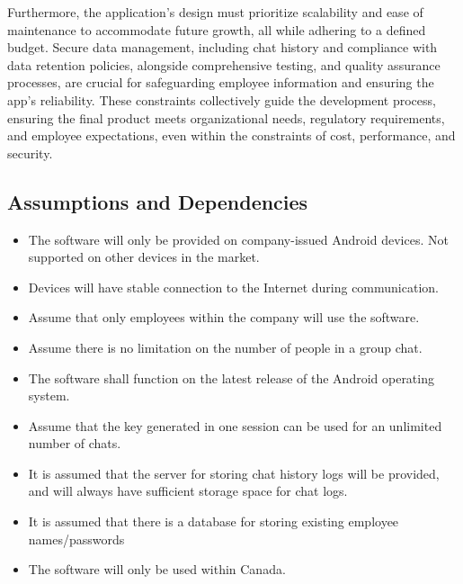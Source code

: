 \documentclass[]{article}
\begin{document}
\hspace{5mm}Furthermore, the application's design must prioritize scalability and ease of maintenance to accommodate future growth, all while adhering to a defined budget. Secure data management, including chat history and compliance with data retention policies, alongside comprehensive testing, and quality assurance processes, are crucial for safeguarding employee information and ensuring the app's reliability. These constraints collectively guide the development process, ensuring the final product meets organizational needs, regulatory requirements, and employee expectations, even within the constraints of cost, performance, and security.


\subsection{Assumptions and Dependencies}
\label{sub:assumptions_and_dependencies}
\begin{itemize}
	\item The software will only be provided on company-issued Android devices. Not supported on other devices in the market.
    \item Devices will have stable connection to the Internet during communication. 
    \item Assume that only employees within the company will use the software. 
    \item Assume there is no limitation on the number of people in a group chat.  
    \item The software shall function on the latest release of the Android operating system. 
    \item Assume that the key generated in one session can be used for an unlimited number of chats. 
    \item It is assumed that the server for storing chat history logs will be provided, and will always have sufficient storage space for chat logs. 
    \item It is assumed that there is a database for storing existing employee names/passwords
    \item The software will only be used within Canada.

\end{itemize}
\end{document}
